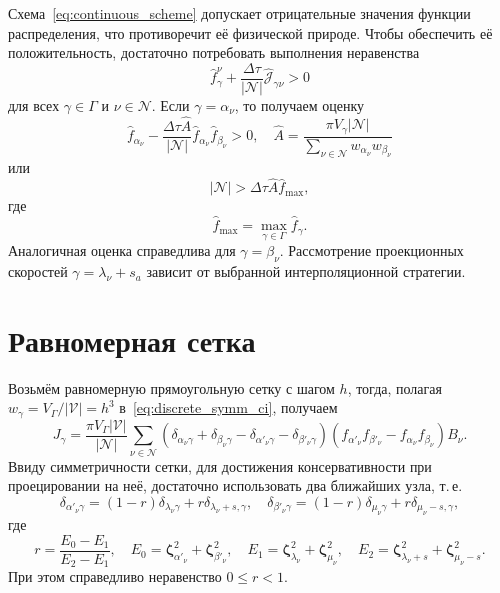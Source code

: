 \documentclass[a4paper,12pt]{article}
\newcommand{\bzeta}{\boldsymbol{\zeta}}
\newcommand{\Nu}{\mathcal{N}}
\begin{document}
Схема~\eqref{eq:continuous_scheme} допускает отрицательные значения функции распределения,
что противоречит её физической природе. Чтобы обеспечить её положительность,
достаточно потребовать выполнения неравенства
\begin{equation}\label{eq:positive_f}
   \hat{f}_\gamma^\nu + \frac{\Delta\tau}{|\Nu|}\hat{\mathscr{J}}_{\gamma\nu} > 0
\end{equation}
для всех \(\gamma\in\Gamma\) и \(\nu\in\Nu\).
Если \(\gamma = \alpha_\nu\), то получаем оценку
\begin{equation}\label{eq:positive_f_alpha}
   \hat{f}_{\alpha_\nu} - \frac{\Delta\tau \hat{A}}{|\Nu|}\hat{f}_{\alpha_\nu}\hat{f}_{\beta_\nu} > 0, \quad
   \hat{A} = \frac{\pi V_\gamma|\Nu|}{\sum_{\nu\in\Nu} w_{\alpha_\nu}w_{\beta_\nu}}
\end{equation}
или
\begin{equation}\label{eq:positive_f_alpha2}
   |\Nu| > \Delta\tau \hat{A} \hat{f}_{\max},
\end{equation}
где
\begin{equation}\label{eq:hat_f_max}
   \hat{f}_{\max} = \max_{\gamma\in\Gamma} \hat{f}_\gamma.
\end{equation}
Аналогичная оценка справедлива для \(\gamma = \beta_\nu\).
Рассмотрение проекционных скоростей \(\gamma = \lambda_\nu+s_a\)
зависит от выбранной интерполяционной стратегии.

\section{Равномерная сетка}

Возьмём равномерную прямоугольную сетку с шагом \(h\), тогда,
полагая \(w_\gamma = V_\Gamma/|\mathcal{V}| = h^3\) в~\eqref{eq:discrete_symm_ci}, получаем
\begin{equation}\label{eq:discrete_symm_ci_uniform}
    J_\gamma = \frac{\pi V_\Gamma|\mathcal{V}|}{|\Nu|}
        \sum_{\nu\in\Nu} \left(
            \delta_{\alpha_\nu\gamma} + \delta_{\beta_\nu\gamma}
            - \delta_{\alpha'_\nu\gamma} - \delta_{\beta'_\nu\gamma}
        \right)\left( f_{\alpha'_\nu} f_{\beta'_\nu} - f_{\alpha_\nu} f_{\beta_\nu} \right)B_\nu.
\end{equation}
Ввиду симметричности сетки, для достижения консервативности при проецировании на неё,
достаточно использовать два ближайших узла, т.\,е.
\begin{equation}\label{eq:uniform_projection}
    \delta_{\alpha'_\nu\gamma} = (1-r)\delta_{\lambda_\nu\gamma} + r\delta_{\lambda_\nu+s,\gamma}, \quad
    \delta_{\beta'_\nu\gamma} = (1-r)\delta_{\mu_\nu\gamma} + r\delta_{\mu_\nu-s,\gamma},
\end{equation}
где
\begin{equation}\label{eq:r_uniform}
    r = \frac{E_0-E_1}{E_2-E_1}, \quad
    E_0 = \bzeta_{\alpha'_\nu}^2 + \bzeta_{\beta'_\nu}^2, \quad
    E_1 = \bzeta_{\lambda_\nu}^2 + \bzeta_{\mu_\nu}^2, \quad
    E_2 = \bzeta_{\lambda_\nu+s}^2 + \bzeta_{\mu_\nu-s}^2.
\end{equation}
При этом справедливо неравенство \(0\leq r < 1\).
\end{document}
